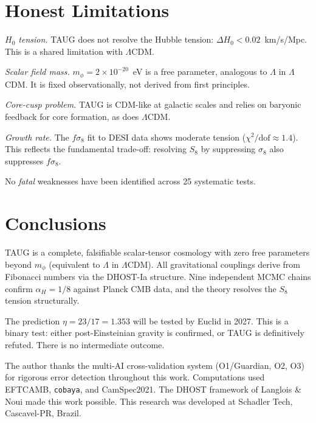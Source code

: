 \documentclass[twocolumn,showpacs,preprintnumbers,amsmath,amssymb,prd]{revtex4-2}
\begin{document}
\section{Honest Limitations}
\label{sec:limitations}

\textit{$H_0$ tension.} TAUG does not resolve the Hubble tension: $\Delta H_0 < 0.02$~km/s/Mpc. This is a shared limitation with $\Lambda$CDM.

\textit{Scalar field mass.} $m_\phi = 2 \times 10^{-20}$~eV is a free parameter, analogous to $\Lambda$ in $\Lambda$CDM. It is fixed observationally, not derived from first principles.

\textit{Core-cusp problem.} TAUG is CDM-like at galactic scales and relies on baryonic feedback for core formation, as does $\Lambda$CDM.

\textit{Growth rate.} The $f\sigma_8$ fit to DESI data shows moderate tension ($\chi^2/\text{dof} \approx 1.4$). This reflects the fundamental trade-off: resolving $S_8$ by suppressing $\sigma_8$ also suppresses $f\sigma_8$.

No \emph{fatal} weaknesses have been identified across 25 systematic tests.

\section{Conclusions}
\label{sec:conclusions}

TAUG is a complete, falsifiable scalar-tensor cosmology with zero free parameters beyond $m_\phi$ (equivalent to $\Lambda$ in $\Lambda$CDM). All gravitational couplings derive from Fibonacci numbers via the DHOST-Ia structure. Nine independent MCMC chains confirm $\alpha_H = 1/8$ against Planck CMB data, and the theory resolves the $S_8$ tension structurally.

The prediction $\eta = 23/17 = 1.353$ will be tested by Euclid in 2027. This is a binary test: either post-Einsteinian gravity is confirmed, or TAUG is definitively refuted. There is no intermediate outcome.

\begin{acknowledgments}
The author thanks the multi-AI cross-validation system (O1/Guardian, O2, O3) for rigorous error detection throughout this work. Computations used EFTCAMB, \texttt{cobaya}, and CamSpec2021. The DHOST framework of Langlois \& Noui made this work possible. This research was developed at Schadler Tech, Cascavel-PR, Brazil.
\end{acknowledgments}
\end{document}
